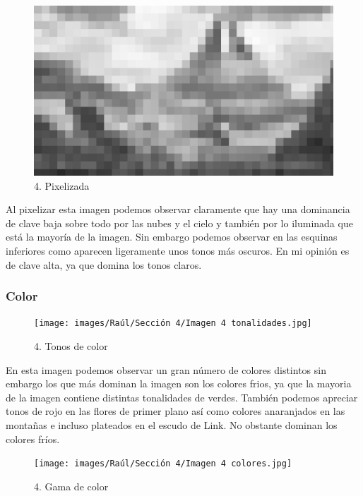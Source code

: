 \documentclass[12pt]{article}
\begin{document}
\begin{figure}[H]
      \centering
      \includegraphics[width=\textwidth]{images/Raúl/Sección 4/Imagen 4 gris pixel.jpg}
      \caption{\small 4. Pixelizada}
\end{figure}

Al pixelizar esta imagen podemos observar claramente que hay una dominancia de clave baja sobre todo por las nubes y el cielo y también por lo iluminada que está la mayoría de la imagen. Sin embargo podemos observar en las esquinas inferiores como aparecen ligeramente unos tonos más oscuros. En mi opinión es de clave alta, ya que domina los tonos claros.


        \subsubsection{Color}

\begin{figure}[H]
      \centering
      \texttt{[image: images/Raúl/Sección 4/Imagen 4 tonalidades.jpg]}
      \caption{\small 4. Tonos de color}
\end{figure}
En esta imagen podemos observar un gran número de colores distintos sin embargo los que más dominan la imagen son los colores frios, ya que la mayoria de la imagen contiene distintas tonalidades de verdes. También podemos apreciar tonos de rojo en las flores de primer plano así como colores anaranjados en las montañas e incluso plateados en el escudo de Link. No obstante dominan los colores fríos.

\begin{figure}[H]
      \centering
      \texttt{[image: images/Raúl/Sección 4/Imagen 4 colores.jpg]}
      \caption{\small 4. Gama de color}
\end{figure}
\end{document}
